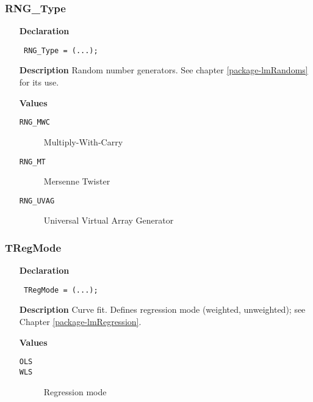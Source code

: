 \documentclass[12pt,a4paper,oneside]{report}
\newcommand{\declarationitem}[1]{\textbf{#1}}
\newcommand{\descriptiontitle}[1]{\textbf{#1}}
\newcommand{\code}[1]{\texttt{#1}}
\begin{document}
\subsubsection{RNG{\_}Type}
\label{utypes-RNG_Type}
\begin{itemize}\item[\declarationitem{Declaration}\hfill]
	\begin{flushleft}
		\code{
			RNG{\_}Type = (...);}
		
	\end{flushleft}
	
	\par
	\item[\descriptiontitle{Description}]
	Random number generators. See chapter \ref{package-lmRandoms} for its use.
	\item[\textbf{Values}]
	\begin{description}
		\item[\texttt{RNG{\_}MWC}] Multiply{-}With{-}Carry
		\item[\texttt{RNG{\_}MT}] Mersenne Twister
		\item[\texttt{RNG{\_}UVAG}] Universal Virtual Array Generator
	\end{description}
\end{itemize}

\subsubsection{TRegMode}
\label{utypes-TRegMode}
\begin{itemize}\item[\declarationitem{Declaration}\hfill]
	\begin{flushleft}
		\code{
			TRegMode = (...);}
	\end{flushleft}
	\item[\descriptiontitle{Description}]
	Curve fit. Defines regression mode (weighted, unweighted); see Chapter \ref{package-lmRegression}.
	
	\item[\textbf{Values}]
	\begin{description}
		\item[\texttt{OLS}]  
		\item[\texttt{WLS}] Regression mode
	\end{description}
\end{itemize}
\end{document}
